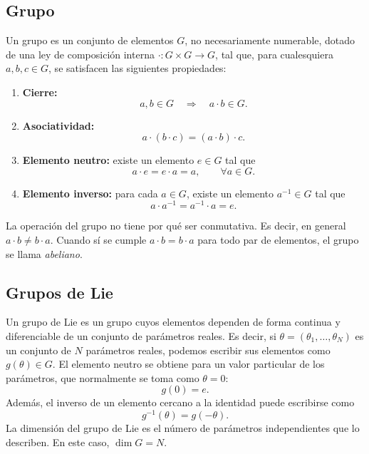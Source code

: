 \documentclass[a4paper,11pt]{book} %
\begin{document}
\subsection{Grupo}
\noindent
Un grupo es un conjunto de elementos \(G\), no necesariamente numerable,
dotado de una ley de composición interna $\cdot : G \times G \longrightarrow G$, tal que, para cualesquiera \(a,b,c \in G\), se satisfacen las siguientes propiedades:
\begin{enumerate}
    \item \textbf{Cierre:}
    \begin{equation}
        a,b \in G
        \quad \Longrightarrow \quad
        a\cdot b \in G.
    \end{equation}
    \item \textbf{Asociatividad:}
    \begin{equation}
        a\cdot (b\cdot c)
        =
        (a\cdot b)\cdot c.
    \end{equation}
    \item \textbf{Elemento neutro:} existe un elemento \(e \in G\) tal que
    \begin{equation}
        a\cdot e = e\cdot a = a,
        \qquad
        \forall a \in G.
    \end{equation}
    \item \textbf{Elemento inverso:} para cada \(a \in G\), existe un elemento
    \(a^{-1}\in G\) tal que
    \begin{equation}
        a\cdot a^{-1}
        =
        a^{-1}\cdot a
        =
        e.
    \end{equation}
\end{enumerate}
\noindent
La operación del grupo no tiene por qué ser conmutativa. Es decir, en general $a\cdot b \neq b\cdot a$. Cuando sí se cumple \(a\cdot b=b\cdot a\) para todo par de elementos, el grupo se llama \textit{abeliano}.
\newpage
\subsection{Grupos de Lie}
\noindent
Un grupo de Lie es un grupo cuyos elementos dependen de forma continua y
diferenciable de un conjunto de parámetros reales. Es decir, si $\theta = (\theta_1,\ldots,\theta_N)$ es un conjunto de \(N\) parámetros reales, podemos escribir sus elementos como $g(\theta) \in G$. 
\medskip\newline
El elemento neutro se obtiene para un valor particular de los parámetros, que normalmente se toma como \(\theta=0\):
\begin{equation}
    g(0)=e.
\end{equation}
\noindent
Además, el inverso de un elemento cercano a la identidad puede escribirse como
\begin{equation}
    g^{-1}(\theta)=g(-\theta).
\end{equation}
\noindent
La dimensión del grupo de Lie es el número de parámetros independientes que
lo describen. En este caso, $\dim G = N.$
\end{document}

